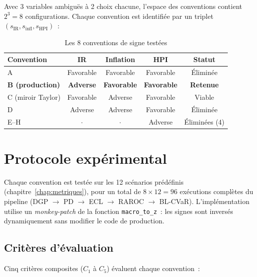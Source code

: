 \documentclass[12pt, a4paper, twoside, openright]{report}
\theoremstyle{definition}
\begin{document}
Avec 3 variables ambiguës à 2 choix chacune, l'espace des conventions contient $2^3 = 8$ configurations. Chaque convention est identifiée par un triplet $(s_{\text{IR}}, s_{\text{infl}}, s_{\text{HPI}})$~:

\begin{table}[htbp]
\centering
\caption{Les 8 conventions de signe testées}
\label{tab:8-conventions}
\begin{tabular}{lcccc}
\toprule
\textbf{Convention} & \textbf{IR} & \textbf{Inflation} & \textbf{HPI} & \textbf{Statut} \\
\midrule
A & Favorable & Favorable & Favorable & Éliminée \\
\textbf{B (production)} & \textbf{Adverse} & \textbf{Favorable} & \textbf{Favorable} & \textbf{Retenue} \\
C (miroir Taylor) & Favorable & Adverse & Favorable & Viable \\
D & Adverse & Adverse & Favorable & Éliminée \\
E--H & $\cdot$ & $\cdot$ & Adverse & Éliminées (4) \\
\bottomrule
\end{tabular}
\end{table}


\section{Protocole expérimental}
\label{sec:conv-protocole}

Chaque convention est testée sur les 12 scénarios prédéfinis (chapitre~\ref{chap:metriques}), pour un total de $8 \times 12 = 96$ exécutions complètes du pipeline (DGP $\to$ PD $\to$ ECL $\to$ RAROC $\to$ BL-CVaR). L'implémentation utilise un \textit{monkey-patch} de la fonction \texttt{macro\_to\_z}~: les signes sont inversés dynamiquement sans modifier le code de production.

\subsection{Critères d'évaluation}

Cinq critères composites ($C_1$ à $C_5$) évaluent chaque convention~:
\end{document}
